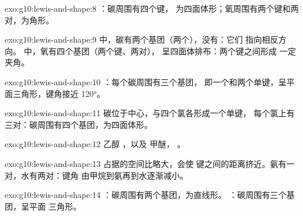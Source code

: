 \begin{solution}{exo:g10:lewis-and-shape:8}
：碳周围有四个键，
为四面体形；氧周围有两个键和两对，为角形。
\end{solution}

\begin{solution}{exo:g10:lewis-and-shape:9}
 中，碳有两个基团（两个），没有：它们
指向相反方向。 中，氧有四个基团（两个键、两对），
呈四面体排布：两个键之间形成
一定夹角。
\end{solution}

\begin{solution}{exo:g10:lewis-and-shape:10}
：每个碳周围有三个基团，
即一个和两个单键，呈平面三角形，键角接近
\ang{120}。
\end{solution}

\begin{solution}{exo:g10:lewis-and-shape:11}
碳位于中心，与四个氯各形成一个单键，
每个氯上有三对：碳周围有四个基团，为四面体形。
\end{solution}

\begin{solution}{exo:g10:lewis-and-shape:12}
乙醇 ，以及
甲醚，
。
\end{solution}

\begin{solution}{exo:g10:lewis-and-shape:13}
占据的空间比略大，会使
键之间的距离挤近。氨有一对，水有两对：键角
由甲烷到氨再到水逐渐减小。
\end{solution}

\begin{solution}{exo:g10:lewis-and-shape:14}
：碳周围有两个基团，为直线形。
：碳周围有三个基团，呈平面
三角形。
\end{solution}

